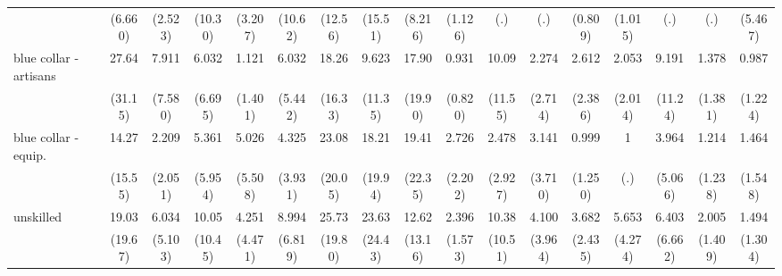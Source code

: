 {\begin{tabular}{l*{16}{c}}
                    &     (6.660)         &     (2.523)         &     (10.30)         &     (3.207)         &     (10.62)         &     (12.56)         &     (15.51)         &     (8.216)         &     (1.126)         &         (.)         &         (.)         &     (0.809)         &     (1.015)         &         (.)         &         (.)         &     (5.467)         \\
[1em]
blue collar - artisans&       27.64\sym{**} &       7.911\sym{*}  &       6.032         &       1.121         &       6.032\sym{*}  &       18.26\sym{**} &       9.623         &       17.90\sym{**} &       0.931         &       10.09\sym{*}  &       2.274         &       2.612         &       2.053         &       9.191         &       1.378         &       0.987         \\
                    &     (31.15)         &     (7.580)         &     (6.695)         &     (1.401)         &     (5.442)         &     (16.33)         &     (11.35)         &     (19.90)         &     (0.820)         &     (11.55)         &     (2.714)         &     (2.386)         &     (2.014)         &     (11.24)         &     (1.381)         &     (1.224)         \\
[1em]
blue collar - equip.&       14.27\sym{*}  &       2.209         &       5.361         &       5.026         &       4.325         &       23.08\sym{***}&       18.21\sym{**} &       19.41\sym{**} &       2.726         &       2.478         &       3.141         &       0.999         &           1         &       3.964         &       1.214         &       1.464         \\
                    &     (15.55)         &     (2.051)         &     (5.954)         &     (5.508)         &     (3.931)         &     (20.05)         &     (19.94)         &     (22.35)         &     (2.202)         &     (2.927)         &     (3.710)         &     (1.250)         &         (.)         &     (5.066)         &     (1.238)         &     (1.548)         \\
[1em]
unskilled           &       19.03\sym{**} &       6.034\sym{*}  &       10.05\sym{*}  &       4.251         &       8.994\sym{**} &       25.73\sym{***}&       23.63\sym{**} &       12.62\sym{*}  &       2.396         &       10.38\sym{*}  &       4.100         &       3.682\sym{*}  &       5.653\sym{*}  &       6.403         &       2.005         &       1.494         \\
                    &     (19.67)         &     (5.103)         &     (10.45)         &     (4.471)         &     (6.819)         &     (19.80)         &     (24.43)         &     (13.16)         &     (1.573)         &     (10.51)         &     (3.964)         &     (2.435)         &     (4.274)         &     (6.662)         &     (1.409)         &     (1.304)         \\

\end{tabular}}
